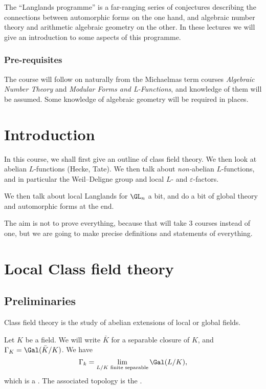 \documentclass[a4paper]{article}
\begin{document}
\maketitle
{\small
\setlength{\parindent}{0em}
\setlength{\parskip}{1em}
The ``Langlands programme'' is a far-ranging series of conjectures describing the connections between automorphic forms on the one hand, and algebraic number theory and arithmetic algebraic geometry on the other. In these lectures we will give an introduction to some aspects of this programme.

\subsubsection*{Pre-requisites}
The course will follow on naturally from the Michaelmas term courses \emph{Algebraic Number Theory} and \emph{Modular Forms and L-Functions}, and knowledge of them will be assumed. Some knowledge of algebraic geometry will be required in places.
}
\tableofcontents

\setcounter{section}{-1}
\section{Introduction}
In this course, we shall first give an outline of class field theory. We then look at abelian $L$-functions (Hecke, Tate). We then talk about \emph{non-}abelian $L$-functions, and in particular the Weil--Deligne group and local $L$- and $\varepsilon$-factors.

We then talk about local Langlands for $\GL_n$ a bit, and do a bit of global theory and automorphic forms at the end.

The aim is not to prove everything, because that will take 3 courses instead of one, but we are going to make precise definitions and statements of everything.

\section{Local Class field theory}
\subsection{Preliminaries}
Class field theory is the study of abelian extensions of local or global fields.
\begin{notation}
  Let $K$ be a field. We will write $\bar{K}$ for a separable closure of $K$, and $\Gamma_K = \Gal(\bar{K}/K)$. We have
  \[
    \Gamma_k = \lim_{L/K\text{ finite separable}} \Gal(L/K),
  \]
  which is a . The associated topology is the .
\end{notation}
\end{document}
